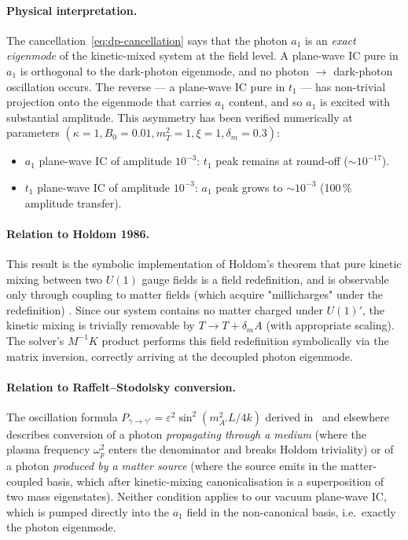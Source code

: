 \paragraph{Physical interpretation.}
The cancellation~\eqref{eq:dp-cancellation} says that the photon
$a_1$ is an \emph{exact eigenmode} of the kinetic-mixed system at
the field level. A plane-wave IC pure in $a_1$ is orthogonal to the
dark-photon eigenmode, and no photon $\to$ dark-photon oscillation
occurs. The reverse --- a plane-wave IC pure in $t_1$ --- has
non-trivial projection onto the eigenmode that carries $a_1$
content, and so $a_1$ is excited with substantial amplitude. This
asymmetry has been verified numerically at parameters $(\kappa = 1,
B_0 = 0.01, m_T^2 = 1, \xi = 1, \delta_m = 0.3)$:
\begin{itemize}
  \item $a_1$ plane-wave IC of amplitude $10^{-3}$:
        $t_1$ peak remains at round-off ($\sim 10^{-17}$).
  \item $t_1$ plane-wave IC of amplitude $10^{-3}$:
        $a_1$ peak grows to $\sim 10^{-3}$ (100\,\% amplitude
        transfer).
\end{itemize}

\paragraph{Relation to Holdom 1986.}
This result is the symbolic implementation of Holdom's theorem that
pure kinetic mixing between two $U(1)$ gauge fields is a field
redefinition, and is observable only through coupling to matter
fields (which acquire "millicharges" under the redefinition)
\cite{Holdom1986}. Since our system contains no matter charged
under $U(1)'$, the kinetic mixing is trivially removable by
$T \to T + \delta_m A$ (with appropriate scaling). The solver's
$M^{-1} K$ product performs this field redefinition symbolically via
the matrix inversion, correctly arriving at the decoupled photon
eigenmode.

\paragraph{Relation to Raffelt--Stodolsky conversion.}
The oscillation formula
$P_{\gamma\to\gamma'} = \varepsilon^2 \sin^2(m_{A'}^2 L / 4 k)$
derived in~\cite{An2013StellarConstraints} and elsewhere describes
conversion of a photon \emph{propagating through a medium} (where
the plasma frequency $\omega_p^2$ enters the denominator and breaks
Holdom triviality) or of a photon \emph{produced by a matter source}
(where the source emits in the matter-coupled basis, which after
kinetic-mixing canonicalisation is a superposition of two mass
eigenstates). Neither condition applies to our vacuum
plane-wave IC, which is pumped directly into the $a_1$ field in the
non-canonical basis, i.e.\ exactly the photon eigenmode.

